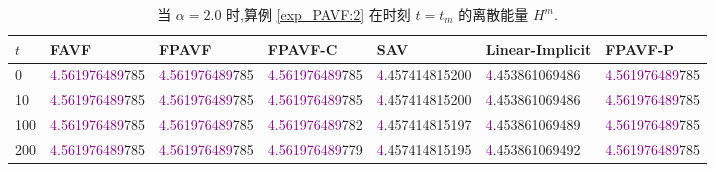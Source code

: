 	
\begin{table}[H]\footnotesize
	\centering
	\caption{当 $\alpha=2.0$ 时,算例 \ref{exp_PAVF:2} 在时刻 $t=t_{m}$ 的离散能量 $H^{m}$.}

	  \begin{tabular}{lllllll}
	  \toprule
       $t$   &FAVF   &FPAVF   &FPAVF-C   &SAV    &Linear-Implicit   &FPAVF-P\\
	\midrule
	0     &\textcolor{purple}{4.561976489}785   &\textcolor{purple}{4.561976489}785   &\textcolor{purple}{4.561976489}785   &\textcolor{purple}{4}.457414815200   &\textcolor{purple}{4}.453861069486   &\textcolor{purple}{4.561976489}785 \\
	10    &\textcolor{purple}{4.561976489}785   &\textcolor{purple}{4.561976489}785   &\textcolor{purple}{4.561976489}785   &\textcolor{purple}{4}.457414815200   &\textcolor{purple}{4}.453861069486   &\textcolor{purple}{4.561976489}785 \\
	100   &\textcolor{purple}{4.561976489}785   &\textcolor{purple}{4.561976489}785   &\textcolor{purple}{4.561976489}782   &\textcolor{purple}{4}.457414815197   &\textcolor{purple}{4}.453861069489   &\textcolor{purple}{4.561976489}785 \\
	200   &\textcolor{purple}{4.561976489}785   &\textcolor{purple}{4.561976489}785   &\textcolor{purple}{4.561976489}779   &\textcolor{purple}{4}.457414815195   &\textcolor{purple}{4}.453861069492   &\textcolor{purple}{4.561976489}785 \\

\end{tabular}
\end{table}

